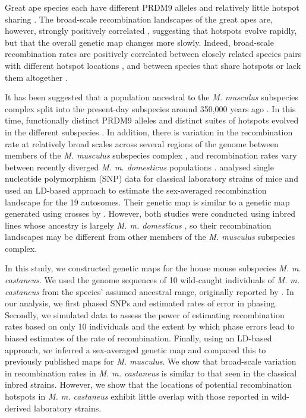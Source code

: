 Great ape species each have different PRDM9 alleles \citep{RN264} and relatively little hotspot sharing \citep{RN214, RN221}. The broad-scale recombination landscapes of the great apes are, however, strongly positively correlated \citep{RN221}, suggesting that hotspots evolve rapidly, but that the overall genetic map changes more slowly. Indeed, broad-scale recombination rates are positively correlated between closely related species pairs with different hotspot locations \citep{RN174}, and between species that share hotspots or lack them altogether \citep{RN258,RN259}.
 
It has been suggested that a population ancestral to the \textit{M. musculus} subspecies complex split into the present-day subspecies around 350,000 years ago \citep{RN315}. In this time, functionally distinct PRDM9 alleles and distinct suites of hotspots evolved in the different subspecies \citep{RN249}. In addition, there is variation in the recombination rate at relatively broad scales across several regions of the genome between members of the \textit{M. musculus} subspecies complex \citep{RN244}, and recombination rates vary between recently diverged \textit{M. m. domesticus} populations \citep{RN267}. \cite{RN156} analysed single nucleotide polymorphism (SNP) data for classical laboratory strains of mice and used an LD-based approach to estimate the sex-averaged recombination landscape for the 19 autosomes. Their genetic map is similar to a genetic map generated using crosses by \cite{RN232}. However, both studies were conducted using inbred lines whose ancestry is largely \textit{M. m. domesticus} \citep{RN243}, so their recombination landscapes may be different from other members of the \textit{M. musculus} subspecies complex.
 
In this study, we constructed genetic maps for the house mouse subspecies \textit{M. m. castaneus}. We used the genome sequences of 10 wild-caught individuals of \textit{M. m. castaneus} from the species' assumed ancestral range, originally reported by \cite{RN122}. In our analysis, we first phased SNPs and estimated rates of error in phasing. Secondly, we simulated data to assess the power of estimating recombination rates based on only 10 individuals and the extent by which phase errors lead to biased estimates of the rate of recombination. Finally, using an LD-based approach, we inferred a sex-averaged genetic map and compared this to previously published maps for \textit{M. musculus}. We show that broad-scale variation in recombination rates in \textit{M. m. castaneus} is similar to that seen in the classical inbred strains. However, we show that the locations of potential recombination hotspots in \textit{M. m. castaneus} exhibit little overlap with those reported in wild-derived laboratory strains.

